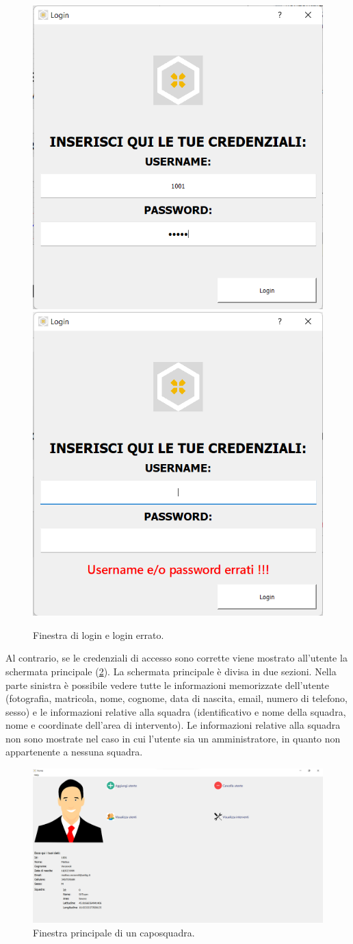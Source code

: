 \begin{figure}[h!]
	\centering
	\includegraphics[width=0.4\linewidth]{./ImageFiles/loginform}
	\includegraphics[width=0.4\linewidth]{./ImageFiles/loginform_errato}
	\caption{Finestra di login e login errato.}
	\label{fig:loginform}
\end{figure}

Al contrario, se le credenziali di accesso sono corrette viene mostrato all'utente la schermata principale (\Fig\ref{fig:home_foreman}). La schermata principale è divisa in due sezioni. Nella parte sinistra è possibile vedere tutte le informazioni memorizzate dell'utente (fotografia, matricola, nome, cognome, data di nascita, email, numero di telefono, sesso) e le informazioni relative alla squadra (identificativo e nome della squadra, nome e coordinate dell'area di intervento). Le informazioni relative alla squadra non sono mostrate nel caso in cui l'utente sia un amministratore, in quanto non appartenente a nessuna squadra.

\begin{figure}[h!]
	\centering
	\includegraphics[width=1\linewidth]{./ImageFiles/home_foreman}
	\caption{Finestra principale di un caposquadra.}
	\label{fig:home_foreman}
\end{figure}

